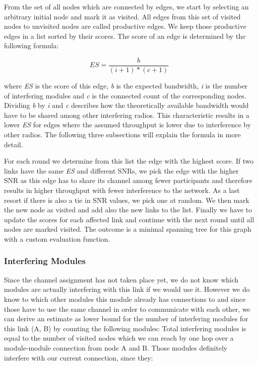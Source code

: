       From the set of all nodes which are connected by edges, we start by selecting an arbitrary initial node and mark it as visited. 
      All edges from this set of visited nodes to unvisited nodes are called productive edges.
      We keep those productive edges in a list sorted by their scores. The score of an edge is determined by the following formula:
      
      \begin{equation} \label{eq:edgescore}
	ES=\frac{b}{(i + 1 )* (c + 1)}
      \end{equation}
      
      where \textit{ES} is the score of this edge, \textit{b} is the expected bandwidth, \textit{i} is the number of 
      interfering modules and \textit{c} is the connected count of the corresponding nodes. 
      Dividing \textit{b} by \textit{i} and \textit{c} describes how the theoretically available bandwidth would have to be shared among other interfering radios.
      This characteristic results in a lower \textit{ES} for edges where the assumed throughput is lower due to interference by other radios.
      The following three subsections will explain the formula in more detail.
      
      For each round we determine from this list the edge with the highest score.
      If two links have the same \textit{ES} and different SNRs, we pick the edge with the higher \ac{SNR} as this edge has to share its channel
      among fewer participants and therefore results in higher throughput with fewer interference to the network.
      As a last resort if there is also a tie in \ac{SNR} values, we pick one at random.
      We then mark the new node as visited and add also the new links to the list.
      Finally we have to update the scores for each affected link and continue with the next round until all nodes are marked visited.
      The outcome is a minimal spanning tree for this graph with a custom evaluation function.
      
\newpage
      
      \subsubsection{Interfering Modules}
	Since the channel assignment has not taken place yet, we do not know which modules are actually interfering with this link if we would use it.
	However we do know to which other modules this module already has connections to and since those have to use the same channel in order to communicate with each other,
	we can derive an estimate as lower bound for the number of interfering modules for this link (A, B) by counting the following modules:
	Total interfering modules is equal to the number of visited nodes which we can reach by one hop over a module-module connection from node A and B.
	Those modules definitely interfere with our current connection, since they:
	
